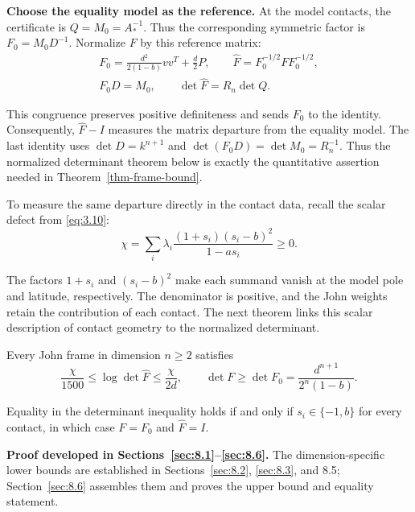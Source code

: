 \textbf{Choose the equality model as the reference.} At the model contacts, the
certificate is $Q=M_0=A_*^{-1}$. Thus the corresponding symmetric factor is
$F_0=M_0D^{-1}$. Normalize $F$ by this reference matrix:
\begin{equation}\label{eq:8.2}
\begin{gathered}
F_0=\frac{d^2}{2(1-b)}vv^T+\frac d2P,
\qquad\widehat F=F_0^{-1/2}FF_0^{-1/2},\\
F_0D=M_0,\qquad\det\widehat F=R_n\det Q.
\end{gathered}
\end{equation}

This congruence preserves positive definiteness and sends $F_0$ to the identity.
Consequently, $\widehat F-I$ measures the matrix departure from the equality
model. The last identity uses $\det D=k^{n+1}$ and
$\det(F_0D)=\det M_0=R_n^{-1}$. Thus the normalized determinant theorem
below is exactly the quantitative assertion needed in Theorem~\ref{thm-frame-bound}.

To measure the same departure directly in the contact data, recall the scalar
defect from \eqref{eq:3.10}:
\begin{equation}\label{eq:8.3}
\chi=\sum_i\lambda_i\frac{(1+s_i)(s_i-b)^2}{1-as_i}\ge0.
\end{equation}

The factors $1+s_i$ and $(s_i-b)^2$ make each summand vanish at the model pole
and latitude, respectively. The denominator is positive, and the John weights
retain the contribution of each contact. The next theorem links this scalar
description of contact geometry to the normalized determinant.

\begin{theorem}\label{thm-determinant}
Every John frame in dimension $n\ge2$ satisfies
\begin{equation}\label{eq:8.4}
\frac{\chi}{1500}\le\log\det\widehat F\le\frac{\chi}{2d},
\qquad
\det F\ge\det F_0=\frac{d^{n+1}}{2^n(1-b)}.
\end{equation}

Equality in the determinant inequality holds if and only if $s_i\in\{-1,b\}$ for every contact, in which case $F=F_0$ and $\widehat F=I$.

\end{theorem}

\textbf{Proof developed in Sections~\ref{sec:8.1}--\ref{sec:8.6}.} The dimension-specific lower
bounds are established in Sections~\ref{sec:8.2}, \ref{sec:8.3}, and 8.5; Section~\ref{sec:8.6} assembles
them and proves the upper bound and equality statement.

